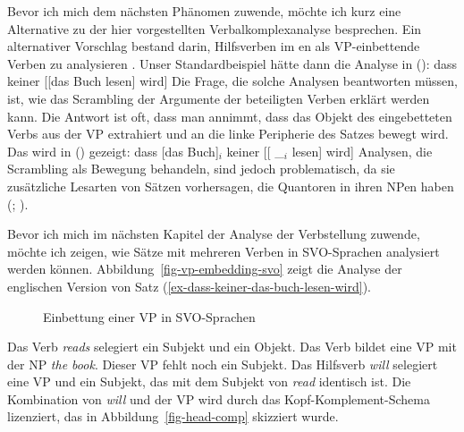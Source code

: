 Bevor ich mich dem nächsten Phänomen zuwende, möchte ich kurz eine Alternative zu der hier vorgestellten
Verbalkomplexanalyse besprechen. Ein alternativer Vorschlag bestand darin, Hilfsverben im en als VP-einbettende Verben zu analysieren \citep{Wurmbrand2003b}. Unser Standardbeispiel hätte dann die Analyse in ():
\ea
dass keiner [[das Buch lesen] wird]
\z
Die Frage, die solche Analysen beantworten müssen, ist, wie das Scrambling der Argumente der beteiligten Verben
erklärt werden kann. Die Antwort ist oft, dass man annimmt, dass das Objekt des eingebetteten Verbs
aus der VP extrahiert und an die linke Peripherie des Satzes bewegt wird. Das wird in () gezeigt:
\ea
dass [das Buch]$_i$ keiner [[ \_$_i$ lesen] wird]
\z
Analysen, die Scrambling als Bewegung behandeln, sind jedoch problematisch, da sie zusätzliche
Lesarten von Sätzen vorhersagen, die Quantoren in ihren NPen haben (\citealp[]{Kiss2001a};
\citealp[Abschnitt~2.6]{Fanselow2001a}).


Bevor ich mich im nächsten Kapitel der Analyse der Verbstellung zuwende, möchte ich zeigen, wie Sätze mit mehreren Verben
\label{page-English-Aux-VPs}
in SVO-Sprachen analysiert werden können. Abbildung~\vref{fig-vp-embedding-svo} zeigt die Analyse der englischen Version von Satz
(\ref{ex-dass-keiner-das-buch-lesen-wird}).
\begin{figure}
\caption{\label{fig-vp-embedding-svo}Einbettung einer VP in SVO-Sprachen}
\end{figure}
Das Verb \emph{reads} selegiert ein Subjekt und ein Objekt. Das Verb bildet eine VP mit der NP \emph{the
  book}. Dieser VP fehlt noch ein Subjekt. Das Hilfsverb \emph{will} selegiert eine VP und ein Subjekt,
das mit dem Subjekt von \emph{read} identisch ist. Die Kombination von \emph{will} und der VP wird
durch das Kopf-Komplement-Schema lizenziert, das in Abbildung~\vref{fig-head-comp} skizziert wurde.

